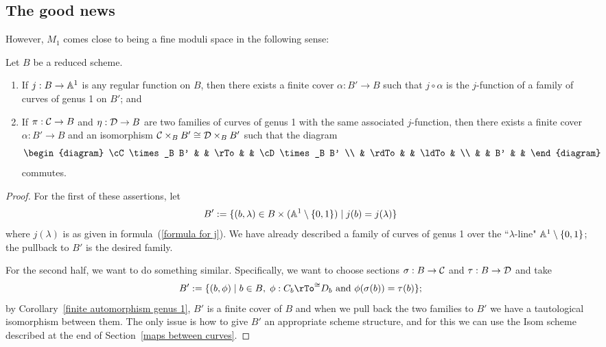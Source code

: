 \subsection{The good news}

However, $M_1$ comes close to being a fine moduli space in the following sense:

\begin{proposition}\label{families on pullbacks} Let $B$ be a reduced scheme.
\begin{enumerate}
\item If $j : B \to \AA^1$ is any regular function on $B$, then there exists a finite cover $\alpha : B' \to B$ such that $j \circ \alpha$ is the $j$-function of a family of curves of genus 1 on $B'$; and
\item If $\pi : \cC \to B$ and $\eta : \cD \to B$ are two families of curves of genus 1 with the same associated $j$-function, then there exists a finite cover $\alpha : B' \to B$ and an isomorphism $\cC \times_B B' \cong \cD \times_B B'$ such that the diagram
$$
\begin{diagram}
\cC \times_B B' & & \rTo & & \cD \times_B B' \\
& \rdTo & & \ldTo & \\
& & B' & &
\end{diagram} 
$$
commutes.
\end{enumerate}
\end{proposition}

\begin{proof} For the first of these assertions, let
$$
B' := \{(b, \lambda) \in B \times (\AA^1 \setminus \{0,1\}) \mid j(b) = j(\lambda)\}
$$
where $j(\lambda)$ is as given in formula~(\ref{formula for j}). We have already described a family of curves of genus 1 over the ``$\lambda$-line" $\AA^1 \setminus \{0,1\}$; the pullback to $B'$ is the desired family.

For the second half, we want to do something similar. Specifically, we want to choose sections $\sigma : B \to \cC$ and $\tau: B \to \cD$ and take
$$
B' := \{ (b, \phi) \mid b \in B, \; \phi : C_b \rTo^{\cong} D_b  \text{ and } \phi(\sigma(b)) = \tau(b) \};
$$
by Corollary~\ref{finite automorphism genus 1}, $B'$ is a finite cover of $B$ and when we pull back the two families to $B'$ we have a tautological isomorphism between them. The only issue is how to give $B'$ an appropriate scheme structure, and for this we can use the Isom scheme described at the end of Section~\ref{maps between curves}.
\end{proof}

